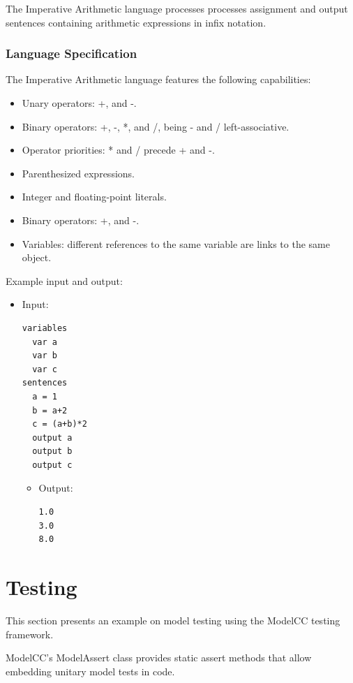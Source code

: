 \documentclass[a4paper,twoside,onecolumn]{article}
\begin{document}
The Imperative Arithmetic language processes processes assignment and output sentences containing arithmetic expressions in infix notation.

\subsubsection{Language Specification}
The Imperative Arithmetic language features the following capabilities:

\begin{itemize}
\item Unary operators: +, and -.
\item Binary operators: +, -, *, and /, being - and / left-associative.
\item Operator priorities: * and / precede + and -.
\item Parenthesized expressions.
\item Integer and floating-point literals.
\item Binary operators: +, and -.
\item Variables: different references to the same variable are links to the same object.
\end{itemize}

Example input and output:

\begin{itemize}
\item Input:
\begin{verbatim}
variables
  var a
  var b
  var c
sentences
  a = 1
  b = a+2
  c = (a+b)*2
  output a
  output b
  output c
\end{verbatim}
\begin{itemize} \item Output:
\begin{verbatim}
1.0
3.0
8.0
\end{verbatim}
\end{itemize}
\end{itemize}

\section{Testing} \label{sec:testing}

This section presents an example on model testing using the ModelCC testing framework.

ModelCC's ModelAssert class provides static assert methods that allow embedding unitary model tests in code.
\end{document}
